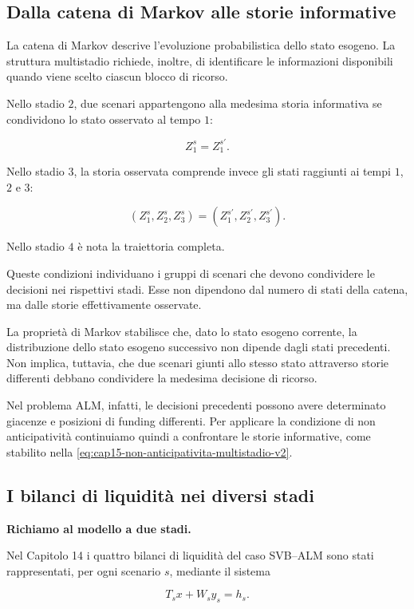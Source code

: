 \subsection{Dalla catena di Markov alle storie informative}

La catena di Markov descrive l'evoluzione
probabilistica dello stato esogeno.
La struttura multistadio richiede,
inoltre, di identificare le informazioni
disponibili quando viene scelto
ciascun blocco di ricorso.

Nello stadio $2$, due scenari
appartengono alla medesima storia
informativa se condividono
lo stato osservato al tempo $1$:

\[
Z_1^s=Z_1^{s'}.
\]

Nello stadio $3$, la storia osservata
comprende invece gli stati raggiunti
ai tempi $1$, $2$ e $3$:

\[
(Z_1^s,Z_2^s,Z_3^s)
=
(Z_1^{s'},Z_2^{s'},Z_3^{s'}).
\]

Nello stadio $4$ \`e nota
la traiettoria completa.

Queste condizioni individuano
i gruppi di scenari che devono
condividere le decisioni nei
rispettivi stadi. Esse non
dipendono dal numero di stati
della catena, ma dalle storie
effettivamente osservate.

La propriet\`a di Markov
stabilisce che, dato lo stato
esogeno corrente, la distribuzione
dello stato esogeno successivo
non dipende dagli stati precedenti.
Non implica, tuttavia, che
due scenari giunti allo stesso
stato attraverso storie differenti
debbano condividere la medesima
decisione di ricorso.

Nel problema ALM, infatti,
le decisioni precedenti possono
avere determinato giacenze
e posizioni di funding differenti.
Per applicare la condizione
di non anticipativit\`a
continuiamo quindi a confrontare
le storie informative, come
stabilito nella
\eqref{eq:cap15-non-anticipativita-multistadio-v2}.

\subsection{I bilanci di liquidit\`a nei diversi stadi}

\medskip

\noindent
\textbf{Richiamo al modello a due stadi.}

Nel Capitolo 14 i quattro bilanci di liquidit\`a
del caso SVB--ALM sono stati rappresentati,
per ogni scenario $s$, mediante il sistema

\[
T_sx+W_sy_s=h_s.
\]

